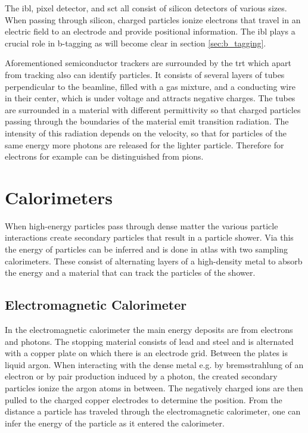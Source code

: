 The \ac{ibl}, pixel detector, and \ac{sct} all consist of silicon detectors of various sizes. When passing through silicon, charged particles ionize electrons that travel in an electric field to an electrode and provide positional information. The \ac{ibl} plays a crucial role in b-tagging as will become clear in section \ref{sec:b_tagging}.

Aforementioned semiconductor trackers are surrounded by the \ac{trt} which apart from tracking also can identify particles. It consists of several layers of tubes perpendicular to the beamline, filled with a gas mixture, and a conducting wire in their center, which is under voltage and attracts negative charges. The tubes are surrounded in a material with different permittivity so that charged particles passing through the boundaries of the material emit transition radiation. The intensity of this radiation depends on the velocity, so that for particles of the same energy more photons are released for the lighter particle. Therefore for electrons for example can be distinguished from pions.

\section{Calorimeters}

When high-energy particles pass through dense matter the various particle interactions create secondary particles that result in a particle shower. Via this the energy of particles can be inferred and is done in \ac{atlas} with two sampling calorimeters. These consist of alternating layers of a high-density metal to absorb the energy and a material that can track the particles of the shower.

\subsection*{Electromagnetic Calorimeter}

In the electromagnetic calorimeter the main energy deposits are from electrons and photons. The stopping material consists of lead and steel and is alternated with a copper plate on which there is an electrode grid. Between the plates is liquid argon. When interacting with the dense metal e.g. by bremsstrahlung of an electron or by pair production induced by a photon, the created secondary particles ionize the argon atoms in between. The negatively charged ions are then pulled to the charged copper electrodes to determine the position. From the distance a particle has traveled through the electromagnetic calorimeter, one can infer the energy of the particle as it entered the calorimeter.

